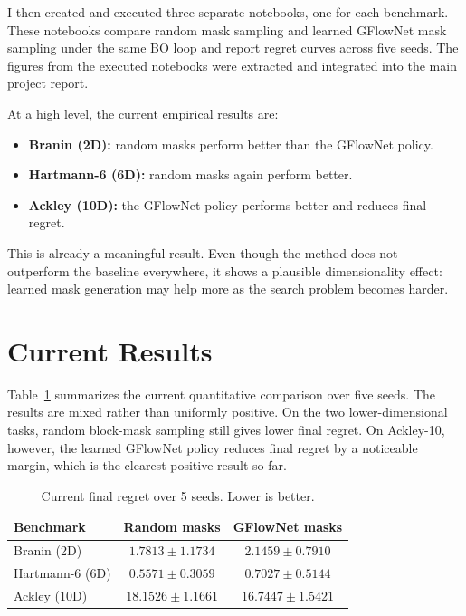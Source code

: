 \documentclass{article}
\begin{document}
I then created and executed three separate notebooks, one for each benchmark. These notebooks compare random mask sampling and learned GFlowNet mask sampling under the same BO loop and report regret curves across five seeds. The figures from the executed notebooks were extracted and integrated into the main project report.

At a high level, the current empirical results are:
\begin{itemize}
    \item \textbf{Branin (2D):} random masks perform better than the GFlowNet policy.
    \item \textbf{Hartmann-6 (6D):} random masks again perform better.
    \item \textbf{Ackley (10D):} the GFlowNet policy performs better and reduces final regret.
\end{itemize}

This is already a meaningful result. Even though the method does not outperform the baseline everywhere, it shows a plausible dimensionality effect: learned mask generation may help more as the search problem becomes harder.

\section{Current Results}

Table~\ref{tab:progress_results} summarizes the current quantitative comparison over five seeds. The results are mixed rather than uniformly positive. On the two lower-dimensional tasks, random block-mask sampling still gives lower final regret. On Ackley-10, however, the learned GFlowNet policy reduces final regret by a noticeable margin, which is the clearest positive result so far.

\begin{table}[t]
\centering
\caption{Current final regret over 5 seeds. Lower is better.}
\label{tab:progress_results}
\small
\begin{tabular}{lcc}
\toprule
Benchmark & Random masks & GFlowNet masks \\
\midrule
Branin (2D) & $1.7813 \pm 1.1734$ & $2.1459 \pm 0.7910$ \\
Hartmann-6 (6D) & $0.5571 \pm 0.3059$ & $0.7027 \pm 0.5144$ \\
Ackley (10D) & $18.1526 \pm 1.1661$ & $16.7447 \pm 1.5421$ \\
\bottomrule
\end{tabular}
\end{table}
\end{document}
